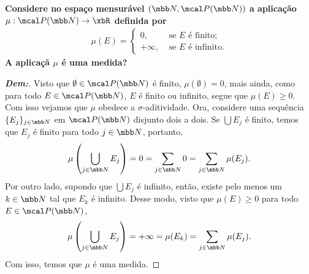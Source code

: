 \biglinend
\newpage 
{}
\myexe{\thedois}
\bigline
\textbf{Considere no espaço 
mensurável $(\mbb N, \mcal P(\mbb N))$ a aplicação $\mu: \mcal 
P(\mbb N) \rightarrow \xbR$
definida por 
\begin{align*}
  \mu(E) = \begin{cases}
    0, &\text{ se $E$ é finito;}\\
    +\infty, &\text{ se $E$ é infinito.}
  \end{cases}
\end{align*}
A aplicaçã $\mu$ é uma medida?
}
\begin{proof}[\textbf{Dem:}]
  Visto que $\emptyset \in \mcal P(\mbb N)$ é finito, 
  $\mu(\emptyset) = 0$, mais ainda, como para todo 
  $E \in \mcal P (\mbb N)$, $E$ é finito ou infinito, segue que $\mu(E) \ge 0$. Com isso
  vejamos que $\mu$ obedece a $\sigma$-aditividade. Ora, considere uma sequência  
  $\{E_j\}_{j \in \mbb N}$ em $\mcal P(\mbb N)$ disjunto dois a dois. Se $\bigcup E_j$
  é finito, temos que $E_j$ é finito para todo $j \in \mbb N$, portanto, 
  \begin{align*}
    \mu\left(\bigcup_{j \in \mbb N} E_j\right) = 0 = \sum_{j \in \mbb N} 0
    = \sum_{j \in \mbb N} \mu(E_j). 
  \end{align*}
  Por outro lado, supondo que $\bigcup E_j$ é infinito, então, existe pelo 
  menos um $k \in \mbb N$ tal que $E_k$ é infinito. Desse modo, 
  visto que $\mu(E) \ge 0$ para todo $E \in \mcal P(\mbb N)$,
  \begin{align*}
    \mu\left(\bigcup_{j \in \mbb N} E_j\right) = +\infty = \mu(E_k)
    = \sum_{j \in \mbb N} \mu(E_j).
  \end{align*}
  Com isso, temos que $\mu$ é uma medida.
\end{proof}

